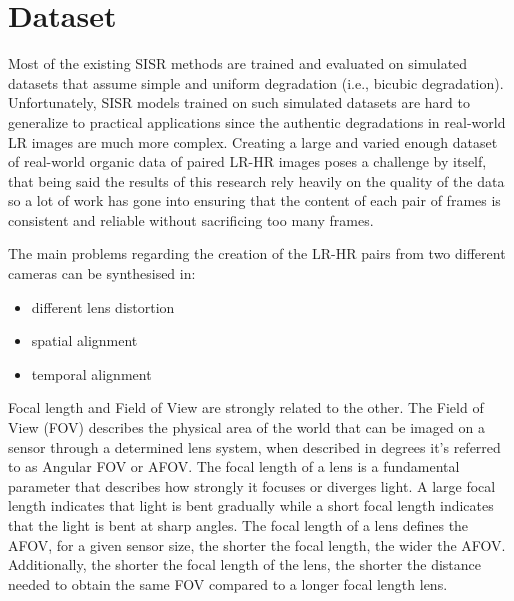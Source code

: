\chapter{Dataset}
\label{cha:dataset}

Most of the existing SISR methods are trained and evaluated on simulated datasets that assume simple and uniform degradation (i.e., bicubic degradation). Unfortunately, SISR models trained on such simulated datasets are hard to generalize to practical applications since the authentic degradations in real-world LR images are much more complex\cite{cai2019realworld}. Creating a large and varied enough dataset of real-world organic data of paired LR-HR images poses a challenge by itself, that being said the results of this research rely heavily on the quality of the data so a lot of work has gone into ensuring that the content of each pair of frames is consistent and reliable without sacrificing too many frames.

The main problems regarding the creation of the LR-HR pairs from two different cameras can be synthesised in:
\begin{itemize}
  \item different lens distortion
  \item spatial alignment
  \item temporal alignment
\end{itemize}

Focal length and Field of View are strongly related to the other. The Field of View (FOV) describes the physical area of the world that can be imaged on a sensor through a determined lens system, when described in degrees it's referred to as Angular FOV or AFOV.
The focal length of a lens is a fundamental parameter that describes how strongly it focuses or diverges light. A large focal length indicates that light is bent gradually while a short focal length indicates that the light is bent at sharp angles.
The focal length of a lens defines the AFOV, for a given sensor size, the shorter the focal length, the wider the AFOV. Additionally, the shorter the focal length of the lens, the shorter the distance needed to obtain the same FOV compared to a longer focal length lens\cite{flength}.


